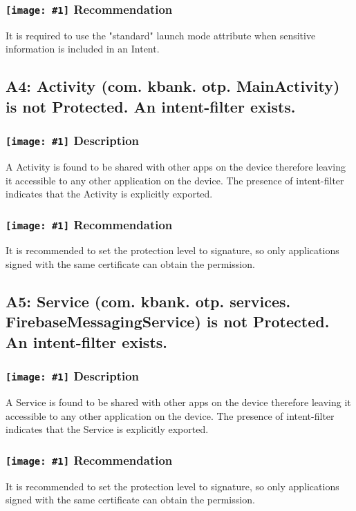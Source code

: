 \documentclass[12p]{article}
\newcommand{\icon}[1]{\texttt{[image: \#1]}}
\begin{document}
\subsubsection*{\protect\icon{/home/miki/Documents/GITHUB/AndroidPermissions/python/vulns/report_icons/basic_todo.png} Recommendation}
It is required to use the "standard" launch mode attribute when sensitive information is included in an Intent.
\subsection{A4: Activity (com. kbank. otp. MainActivity) is not Protected. An intent-filter exists.}
\subsubsection*{\protect\icon{/home/miki/Documents/GITHUB/AndroidPermissions/python/vulns/report_icons/basic_sheet.png} Description}
A  Activity is found to be shared with other apps on the device therefore leaving it accessible to any other application on the device. The presence of intent-filter indicates that the Activity is explicitly exported.
\subsubsection*{\protect\icon{/home/miki/Documents/GITHUB/AndroidPermissions/python/vulns/report_icons/basic_todo.png} Recommendation}
It is recommended to set the protection level to signature, so only applications signed with the same certificate can obtain the permission.
\subsection{A5: Service (com. kbank. otp. services. FirebaseMessagingService) is not Protected. An intent-filter exists.}
\subsubsection*{\protect\icon{/home/miki/Documents/GITHUB/AndroidPermissions/python/vulns/report_icons/basic_sheet.png} Description}
A  Service is found to be shared with other apps on the device therefore leaving it accessible to any other application on the device. The presence of intent-filter indicates that the Service is explicitly exported.
\subsubsection*{\protect\icon{/home/miki/Documents/GITHUB/AndroidPermissions/python/vulns/report_icons/basic_todo.png} Recommendation}
It is recommended to set the protection level to signature, so only applications signed with the same certificate can obtain the permission.
\end{document}
